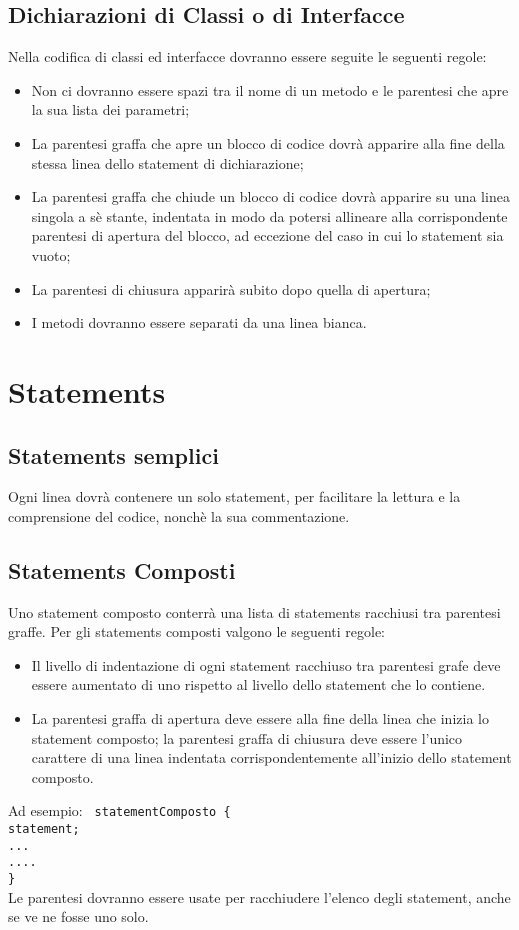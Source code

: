 \subsection{Dichiarazioni di Classi o di Interfacce}
Nella codifica di classi ed interfacce dovranno essere seguite le seguenti regole:
\begin{itemize}
\item Non ci dovranno essere spazi tra il nome di un metodo e le parentesi che apre la sua lista dei parametri;
\item La parentesi graffa che apre un blocco di codice dovr\`a apparire alla fine della stessa linea dello statement di dichiarazione;
\item La parentesi graffa che chiude un blocco di codice dovr\`a apparire su una linea singola a s\`e stante, indentata in modo da potersi allineare alla corrispondente parentesi di apertura del blocco, ad eccezione del caso in cui lo statement sia vuoto;
\item La parentesi di chiusura apparir\`a subito dopo quella di apertura;
\item I metodi dovranno essere separati da una linea bianca.
\end{itemize}

\section{Statements}
\subsection{Statements semplici}
Ogni linea dovr\`a contenere un solo statement, per facilitare la lettura e la comprensione del codice, nonch\`e la sua commentazione.
\subsection{Statements Composti}
Uno statement composto conterr\`a una lista di statements racchiusi tra parentesi graffe. Per gli statements composti valgono le seguenti regole:
\begin{itemize}
\item Il livello di indentazione di ogni statement racchiuso tra parentesi grafe deve essere aumentato di uno rispetto al livello dello statement che lo contiene.
\item La parentesi graffa di apertura deve essere alla fine della linea che inizia lo statement composto; la parentesi graffa di chiusura deve essere l'unico carattere di una linea indentata corrispondentemente all'inizio dello statement composto.\newline
\end{itemize}
Ad esempio:\newline
	\newline
	\texttt{
	statementComposto \{ \\
	\phantom{....}statement;\\
	\phantom{....}... \\
	\phantom{....}.... \\
	\}
} \\
 \newline
Le parentesi dovranno essere usate per racchiudere l'elenco degli statement, anche se ve ne fosse uno solo.
